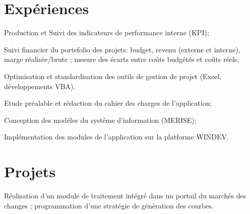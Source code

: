 \documentclass[]{arm-resume}
\begin{document}
\begin{minipage}[t]{0.66\textwidth} 


\section{Expériences}

\vspace{\topsep}
\begin{tightemize}\item Production et Suivi des indicateurs de performance interne (KPI);
\item Suivi financier du portefolio des projets: budget, revenu (externe et interne), marge réalisée/brute ; mesure des écarts entre coûts budgétés et coûts réels;
\item Optimisation et standardisation des outils de gestion de projet (Excel, développements VBA).\end{tightemize}

\sectionsep

\begin{tightemize}
\item Etude préalable et rédaction du cahier des charges de l’application;\item Conception des modéles du systéme d’information (MERISE);\item Implémentation des modules de l’application sur la platforme WINDEV.\end{tightemize}
\sectionsep



\section{Projets}
\location{}
Réalisation d'un module de traitement intégré dans un portail du marchés des changes ; programmation d'une stratégie de génération des courbes.
\sectionsep


\end{minipage}
\end{document}
